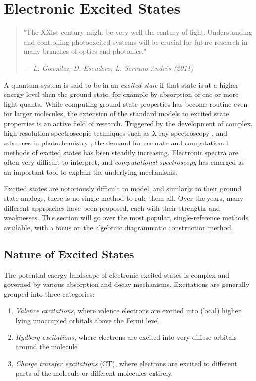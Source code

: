 \chapter{Electronic Excited States}

\begin{quote}
  "The XXIst century might be very well the century of light. Understanding and controlling photoexcited systems will be crucial for future research in many branches of optics and photonics."
  \begin{flushright}
    \small{--- \textit{L. González, D. Escudero, L. Serrano-Andrés (2011) \cite{Gon2012} }}
  \end{flushright}
\end{quote}

A quantum system is said to be in an \emph{excited state} if that state is at a higher energy level than the ground state, for example by absorption of one or more light quanta. While computing ground state properties has become routine even for larger molecules, the extension of the standard models to excited state properties is an active field of research. Triggered by the development of complex, high-resolution spectroscopic techniques such as X-ray spectroscopy \cite{Nor2018a}, and advances in photochemistry \cite{Gon2012}, the demand for accurate and computational methods of excited states has been steadily increasing. Electronic spectra are often very difficult to interpret, and \emph{computational spectroscopy} has emerged as an important tool to explain the underlying mechanisms.

Excited states are notoriously difficult to model, and similarly to their ground state analogs, there is no single method to rule them all. Over the years, many different approaches have been proposed, each with their strengths and weaknesses. This section will go over the most popular, single-reference methods  available, with a focus on the algebraic diagrammatic construction method. 

\section{Nature of Excited States}

The potential energy landscape of electronic excited states is complex and governed by various absorption and decay mechanisms. Excitations are generally grouped into three categories:
\begin{enumerate}
\item \emph{Valence excitations}, where valence electrons are excited into (local) higher lying unoccupied orbitals above the Fermi level
\item \emph{Rydberg excitations}, where electrons are excited into very diffuse orbitals around the molecule
\item \emph{Charge transfer excitations} (CT), where electrons are excited to different parts of the molecule or different molecules entirely. 
\end{enumerate}

